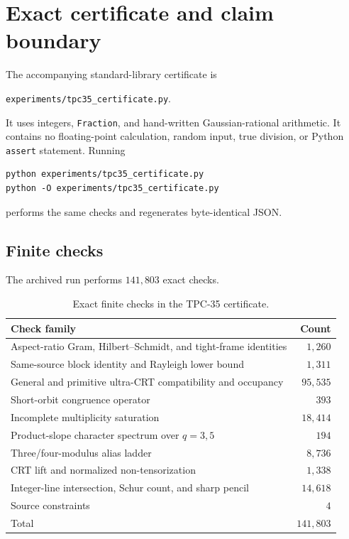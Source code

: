 \section{Exact certificate and claim boundary}
\label{sec:tpc35-certificate-scope}

The accompanying standard-library certificate is
\begin{center}
 \texttt{experiments/tpc35\_certificate.py}.
\end{center}
It uses integers, \texttt{Fraction}, and hand-written Gaussian-rational
arithmetic.  It contains no floating-point calculation, random input,
true division, or Python \texttt{assert} statement.  Running
\begin{verbatim}
python experiments/tpc35_certificate.py
python -O experiments/tpc35_certificate.py
\end{verbatim}
performs the same checks and regenerates byte-identical JSON.

\subsection{Finite checks}

The archived run performs \(141{,}803\) exact checks.

\begin{table}[H]
\centering
\caption{Exact finite checks in the TPC-35 certificate.}
\label{tab:tpc35-certificate-counts}
\small
\begin{tabular}{@{}lr@{}}
\toprule
Check family & Count \\
\midrule
Aspect-ratio Gram, Hilbert--Schmidt, and tight-frame identities
 & \(1{,}260\) \\
Same-source block identity and Rayleigh lower bound
 & \(1{,}311\) \\
General and primitive ultra-CRT compatibility and occupancy
 & \(95{,}535\) \\
Short-orbit congruence operator
 & \(393\) \\
Incomplete multiplicity saturation
 & \(18{,}414\) \\
Product-slope character spectrum over \(q=3,5\)
 & \(194\) \\
Three/four-modulus alias ladder
 & \(8{,}736\) \\
CRT lift and normalized non-tensorization
 & \(1{,}338\) \\
Integer-line intersection, Schur count, and sharp pencil
 & \(14{,}618\) \\
Source constraints
 & \(4\) \\
\midrule
Total & \(141{,}803\) \\
\bottomrule
\end{tabular}
\end{table}

